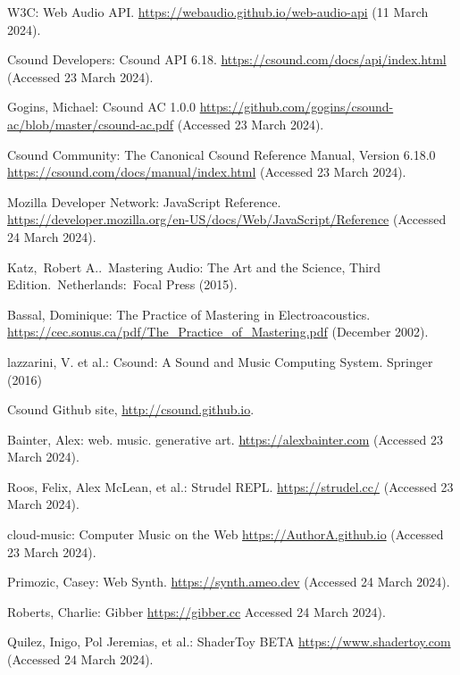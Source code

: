 \documentclass[runningheads,a4paper]{llncs}
\begin{document}
\begin{thebibliography}{4}
 W3C: Web Audio API. \url{https://webaudio.github.io/web-audio-api} (11 March 2024).

 Csound Developers: Csound API 6.18. \url{https://csound.com/docs/api/index.html} (Accessed 23 March 2024).

 Gogins, Michael: Csound AC 1.0.0 \url{https://github.com/gogins/csound-ac/blob/master/csound-ac.pdf} (Accessed 23 March 2024).

 Csound Community: The Canonical Csound Reference Manual, Version 6.18.0 \url{https://csound.com/docs/manual/index.html} (Accessed 23 March 2024).

 Mozilla Developer Network: JavaScript Reference. \url{https://developer.mozilla.org/en-US/docs/Web/JavaScript/Reference} (Accessed 24 March 2024).

 Katz, Robert A.. Mastering Audio: The Art and the Science, Third Edition. Netherlands: Focal Press (2015).

 Bassal, Dominique: The Practice of Mastering in Electroacoustics. \url{https://cec.sonus.ca/pdf/The\_Practice\_of\_Mastering.pdf} (December 2002).

 lazzarini, V. et al.: Csound: A Sound and Music Computing System.
Springer (2016)

 Csound Github site, \url{http://csound.github.io}.

 Bainter, Alex: web. music.
generative art. \url{https://alexbainter.com} (Accessed 23 March 2024).

 Roos, Felix, Alex McLean, et al.: Strudel REPL. \url{https://strudel.cc/} (Accessed 23 March 2024).

 cloud-music: Computer Music on the Web \url{https://AuthorA.github.io} (Accessed 23 March 2024).

 Primozic, Casey: Web Synth. \url{https://synth.ameo.dev} (Accessed 24 March 2024).
 
 Roberts, Charlie: Gibber \url{https://gibber.cc} Accessed 24 March 2024).

 Quilez, Inigo, Pol Jeremias, et al.: ShaderToy BETA \url{https://www.shadertoy.com} (Accessed 24 March 2024).

\end{thebibliography}
\end{document}
